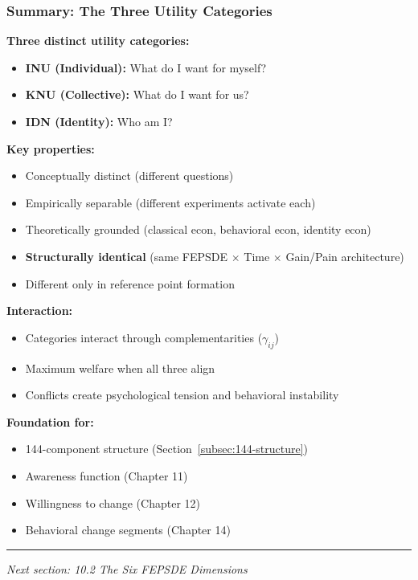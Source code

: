 \subsubsection{Summary: The Three Utility Categories}

\begin{tcolorbox}[colback=gray!5!white, colframe=gray!75!black, title=Section 10.1 Summary]
\textbf{Three distinct utility categories:}
\begin{itemize}
\item \textbf{INU (Individual):} What do I want for myself?
\item \textbf{KNU (Collective):} What do I want for us?
\item \textbf{IDN (Identity):} Who am I?
\end{itemize}

\textbf{Key properties:}
\begin{itemize}
\item Conceptually distinct (different questions)
\item Empirically separable (different experiments activate each)
\item Theoretically grounded (classical econ, behavioral econ, identity econ)
\item \textbf{Structurally identical} (same FEPSDE $\times$ Time $\times$ Gain/Pain architecture)
\item Different only in reference point formation
\end{itemize}

\textbf{Interaction:}
\begin{itemize}
\item Categories interact through complementarities ($\gamma_{ij}$)
\item Maximum welfare when all three align
\item Conflicts create psychological tension and behavioral instability
\end{itemize}

\textbf{Foundation for:}
\begin{itemize}
\item 144-component structure (Section~\ref{subsec:144-structure})
\item Awareness function (Chapter 11)
\item Willingness to change (Chapter 12)
\item Behavioral change segments (Chapter 14)
\end{itemize}
\end{tcolorbox}

\vspace{1em}
\hrule
\vspace{0.5em}
\noindent\textit{Next section: 10.2 The Six FEPSDE Dimensions}

